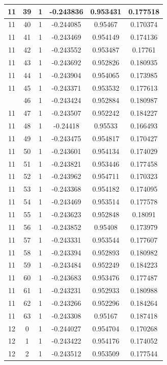 \documentclass[12pt,a4paper]{article}
\numberwithin{equation}{section}
\numberwithin{figure}{section}
\numberwithin{table}{section}
\begin{document}
\begin{longtable}{|c|c|c|c|c|c|}
11 & 39 & 1 & -0.243836 & 0.953431 & 0.177518 \\ \hline
11 & 40 & 1 & -0.244085 & 0.95467 & 0.170374 \\ \hline
11 & 41 & 1 & -0.243469 & 0.954149 & 0.174136 \\ \hline
11 & 42 & 1 & -0.243552 & 0.953487 & 0.17761 \\ \hline
11 & 43 & 1 & -0.243692 & 0.952826 & 0.180935 \\ \hline
11 & 44 & 1 & -0.243904 & 0.954065 & 0.173985 \\ \hline
11 & 45 & 1 & -0.243371 & 0.953532 & 0.177613 \\ \hline
\pagebreak
11 & 46 & 1 & -0.243424 & 0.952884 & 0.180987 \\ \hline
11 & 47 & 1 & -0.243507 & 0.952242 & 0.184227 \\ \hline
11 & 48 & 1 & -0.24418 & 0.95533 & 0.166493 \\ \hline
11 & 49 & 1 & -0.243475 & 0.954817 & 0.170427 \\ \hline
11 & 50 & 1 & -0.243601 & 0.954134 & 0.174029 \\ \hline
11 & 51 & 1 & -0.243821 & 0.953446 & 0.177458 \\ \hline
11 & 52 & 1 & -0.243962 & 0.954711 & 0.170323 \\ \hline
11 & 53 & 1 & -0.243368 & 0.954182 & 0.174095 \\ \hline
11 & 54 & 1 & -0.243469 & 0.953514 & 0.177578 \\ \hline
11 & 55 & 1 & -0.243623 & 0.952848 & 0.18091 \\ \hline
11 & 56 & 1 & -0.243852 & 0.95408 & 0.173979 \\ \hline
11 & 57 & 1 & -0.243331 & 0.953544 & 0.177607 \\ \hline
11 & 58 & 1 & -0.243394 & 0.952893 & 0.180982 \\ \hline
11 & 59 & 1 & -0.243484 & 0.952249 & 0.184223 \\ \hline
11 & 60 & 1 & -0.243683 & 0.953476 & 0.177487 \\ \hline
11 & 61 & 1 & -0.243231 & 0.952933 & 0.180988 \\ \hline
11 & 62 & 1 & -0.243266 & 0.952296 & 0.184264 \\ \hline
11 & 63 & 1 & -0.243308 & 0.95167 & 0.187418 \\ \hline
12 & 0 & 1 & -0.244027 & 0.954704 & 0.170268 \\ \hline
12 & 1 & 1 & -0.243422 & 0.954176 & 0.174052 \\ \hline
12 & 2 & 1 & -0.243512 & 0.953509 & 0.177544 \\ \hline

\end{longtable}
\end{document}
